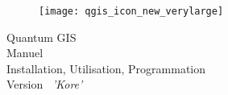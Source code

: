 \begin{titlepage}
\begin{center}

\begin{figure}[H]
\begin{center}
\texttt{[image: qgis\_icon\_new\_verylarge]} 
\end{center}
\end{figure}

\Huge{Quantum GIS}\\
\vspace{0.5cm}
\Large{Manuel \\Installation, Utilisation, Programmation} \\
\vspace{0.5cm}
\Large{Version ~\CURRENT \textsl{'Kore'}}

\end{center}
\end{titlepage}
